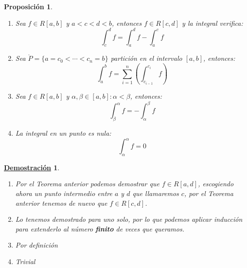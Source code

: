 \documentclass[10pt,a4paper,openright]{book}
\theoremstyle{break}
\newtheorem{prop}{Proposición}[chapter]
\newtheorem*{demo}{\underline{Demostración}}
\begin{document}
\begin{prop}
\begin{enumerate}
\item Sea $f\in R[a,b]$ y $a<c<d<b$, entonces $f\in R[c,d]$ y la integral verifica:
$$\int_{c}^{d} f = \int_{a}^{d} f - \int_{a}^{c} f$$

\item Sea $\mathring{P} = \{a = c_0 < \cdots < c_n = b\}$ partición en el intervalo $[a,b]$, entonces:
$$\int_{a}^{b} f = \sum_{i = 1}^{n} \left(\int_{c_{i-1}}^{c_i} f\right)$$

\item Sea $f\in R[a,b]$ y $\alpha,\beta\in [a,b]: \alpha < \beta$, entonces:
$$\int_{\beta}^{\alpha} f {=} - \int_{\alpha}^{\beta} f$$
\item La integral en un punto es nula:
$$\int_{\alpha}^{\alpha} f = 0$$
\end{enumerate}
\end{prop}
\begin{demo}
\begin{enumerate}
\item Por el Teorema anterior podemos demostrar que $f\in R[a,d]$, escogiendo ahora un punto intermedio entre $a$ y $d$ que llamaremos $c$, por el Teorema anterior tenemos de nuevo que $f\in R[c,d]$.

\item Lo tenemos demostrado para uno solo, por lo que podemos aplicar inducción para extenderlo al número \textbf{finito} de veces que queramos.

\item Por definición

\item Trivial
\end{enumerate}
\end{demo}
\end{document}
